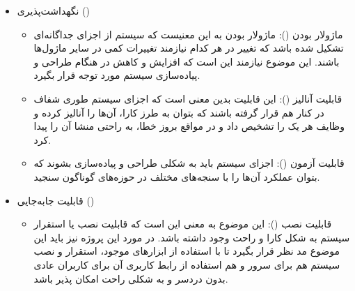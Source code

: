 \begin{itemize}
\item 
نگهداشت‌پذیری ()
\begin{itemize}
	
	\item
	ماژولار بودن (): ماژولار بودن به این معنیست که سیستم از اجزای جداگانه‌ای تشکیل شده باشد که تغییر در هر کدام نیازمند تغییرات کمی در سایر ماژول‌ها باشند. این موضوع نیازمند این است که افزایش  و کاهش  در هنگام طراحی و پیاده‌سازی سیستم مورد توجه قرار بگیرد.
	
	\item 
	قابلیت آنالیز (): این قابلیت بدین معنی است که اجزای سیستم طوری شفاف در کنار هم قرار گرفته باشند که بتوان به طرز کارا، آن‌ها را آنالیز کرده و وظایف هر یک را تشخیص داد و در مواقع بروز خطا، به راحتی منشا آن را پیدا کرد.
	
	\item 
	قابلیت آزمون (): اجزای سیستم باید به شکلی طراحی و پیاده‌سازی بشوند که بتوان عملکرد آن‌ها را با سنجه‌های مختلف در حوزه‌های گوناگون سنجید.
	
\end{itemize}


\item
قابلیت جابه‌جایی ()

\begin{itemize}
	\item
	قابلیت نصب ():
	این موضوع به معنی این است که قابلیت نصب یا استقرار سیستم به شکل کارا و راحت وجود داشته باشد. در مورد این پروژه نیز باید این موضوع مد نظر قرار بگیرد تا با استفاده از ابزارهای موجود، استقرار و نصب سیستم هم برای سرور و هم استفاده از رابط کاربری آن برای کاربران عادی بدون دردسر و به شکلی راحت امکان پذیر باشد.
	
\end{itemize}
\end{itemize}

